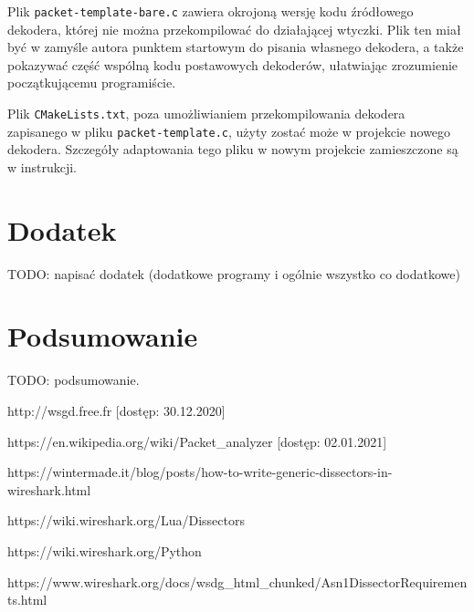 \documentclass[a4paper, 12pt, twoside, openright]{article}
\begin{document}
	Plik \texttt{packet-template-bare.c} zawiera okrojoną wersję kodu źródłowego dekodera, której nie można przekompilować
	do działającej wtyczki. Plik ten miał być w zamyśle autora punktem startowym do pisania własnego dekodera, a także
	pokazywać część wspólną kodu postawowych dekoderów, ułatwiając zrozumienie początkującemu programiście.

	Plik \texttt{CMakeLists.txt}, poza umożliwianiem przekompilowania dekodera zapisanego w pliku \texttt{packet-template.c},
	użyty zostać może w projekcie nowego dekodera. Szczegóły adaptowania tego pliku w nowym projekcie zamieszczone są w instrukcji.



\newpage
\section{Dodatek}

	TODO: napisać dodatek (dodatkowe programy i ogólnie wszystko co dodatkowe)

\newpage
\section{Podsumowanie}

	TODO: podsumowanie.

\newpage

\begin{thebibliography}{99}

		http://wsgd.free.fr [dostęp: 30.12.2020]

		https://en.wikipedia.org/wiki/Packet\_analyzer [dostęp: 02.01.2021]

		https://wintermade.it/blog/posts/how-to-write-generic-dissectors-in-wireshark.html

		https://wiki.wireshark.org/Lua/Dissectors

		https://wiki.wireshark.org/Python

		https://www.wireshark.org/docs/wsdg\_html\_chunked/Asn1DissectorRequirements.html


\end{thebibliography}


\vspace{85mm}
\end{document}
